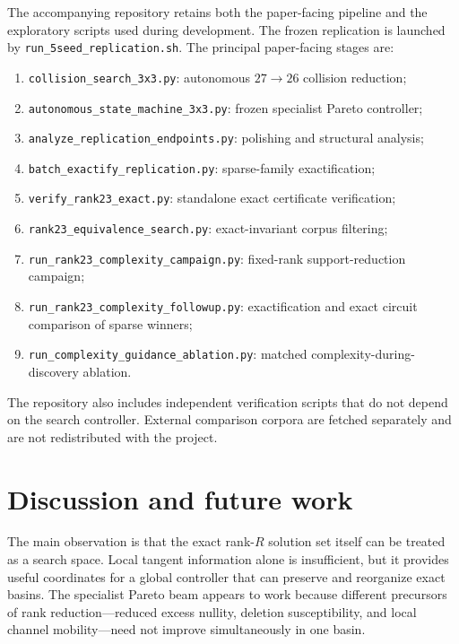 \documentclass[11pt]{article}
\begin{document}
The accompanying repository retains both the paper-facing pipeline and the exploratory scripts used during development.  The frozen replication is launched by \texttt{run\_5seed\_replication.sh}.  The principal paper-facing stages are:
\begin{enumerate}[leftmargin=1.5em]
    \item \texttt{collision\_search\_3x3.py}: autonomous $27\to26$ collision reduction;
    \item \texttt{autonomous\_state\_machine\_3x3.py}: frozen specialist Pareto controller;
    \item \texttt{analyze\_replication\_endpoints.py}: polishing and structural analysis;
    \item \texttt{batch\_exactify\_replication.py}: sparse-family exactification;
    \item \texttt{verify\_rank23\_exact.py}: standalone exact certificate verification;
    \item \texttt{rank23\_equivalence\_search.py}: exact-invariant corpus filtering;
    \item \texttt{run\_rank23\_complexity\_campaign.py}: fixed-rank support-reduction campaign;
    \item \texttt{run\_rank23\_complexity\_followup.py}: exactification and exact circuit comparison of sparse winners;
    \item \texttt{run\_complexity\_guidance\_ablation.py}: matched complexity-during-discovery ablation.
\end{enumerate}

The repository also includes independent verification scripts that do not depend on the search controller.  External comparison corpora are fetched separately and are not redistributed with the project.

\section{Discussion and future work}

The main observation is that the exact rank-$R$ solution set itself can be treated as a search space.  Local tangent information alone is insufficient, but it provides useful coordinates for a global controller that can preserve and reorganize exact basins.  The specialist Pareto beam appears to work because different precursors of rank reduction---reduced excess nullity, deletion susceptibility, and local channel mobility---need not improve simultaneously in one basin.
\end{document}
